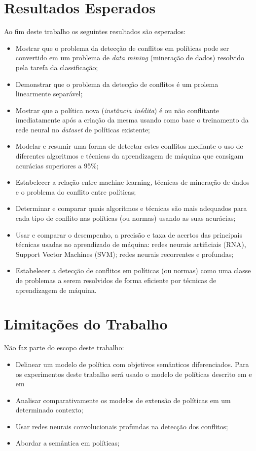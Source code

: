 \section{Resultados Esperados}\label{resultados_esperados}
Ao fim deste trabalho os seguintes resultados são esperados:
\begin{itemize}
	\item Mostrar que o problema da detecção de conflitos em políticas pode ser convertido em um problema de \textit{data mining} (mineração de dados) resolvido pela tarefa da classificação;
	\item Demonstrar que o problema da detecção de conflitos é um prolema linearmente separável;
	\item Mostrar que a política nova (\textit{instância inédita})  é ou não conflitante imediatamente após a criação da mesma usando como base o treinamento da rede neural no \textit{dataset} de políticas existente;
	\item Modelar e resumir uma forma de detectar estes conflitos mediante o uso de diferentes algoritmos e técnicas da aprendizagem de máquina que consigam acurácias superiores a 95\%;
	\item Estabelecer a relação entre machine learning, técnicas de mineração de dados e o problema do conflito entre políticas;
	\item Determinar e comparar quais algoritmos e técnicas são mais adequados para cada tipo de conflito nas políticas (ou normas) usando as suas acurácias;
	\item Usar e comparar o desempenho, a precisão e taxa de acertos das principais técnicas usadas no aprendizado de máquina: redes neurais artificiais (RNA), Support Vector Machines (SVM); redes neurais recorrentes e profundas;
	\item Estabelecer a detecção de conflitos em políticas (ou normas) como uma  classe de problemas a serem resolvidos de forma eficiente por técnicas de aprendizagem de máquina.
\end{itemize} 

\section{Limitações do Trabalho}\label{limitacoes}
Não faz parte do escopo deste trabalho:
\begin{itemize}
	\item Delinear um modelo de política com objetivos semânticos diferenciados. Para os experimentos deste trabalho será usado o modelo de políticas descrito em \cite{sarkis2017} e em \cite{sarkis:artigo:2016}
	\item Analisar comparativamente os modelos de extensão de políticas em um determinado contexto;
	\item Usar redes neurais convolucionais profundas na detecção dos conflitos;
	\item Abordar a semântica em políticas;	
\end{itemize} 

